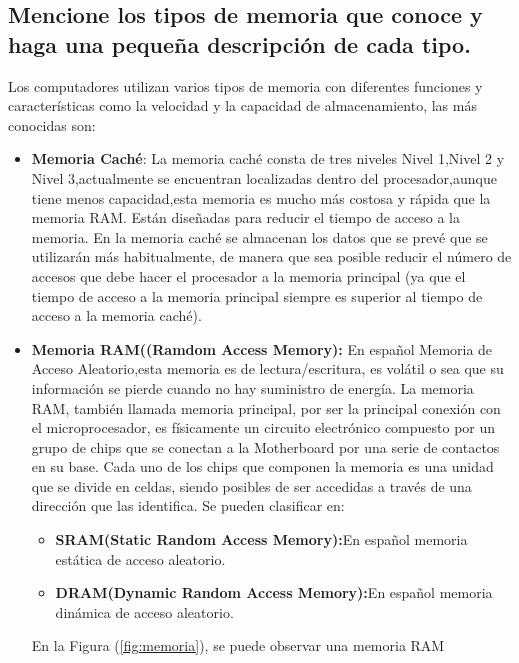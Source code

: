 \documentclass{article}
\begin{document}
\subsection{Mencione los tipos de memoria que conoce y haga una pequeña descripción de cada tipo.}
Los computadores utilizan varios tipos de memoria con diferentes funciones y características como la velocidad y la capacidad de almacenamiento, las más conocidas son:
\begin{itemize}
\item \textbf{Memoria Caché}:
    La memoria caché consta de tres niveles Nivel 1,Nivel 2 y Nivel 3,actualmente se encuentran localizadas dentro del procesador,aunque tiene menos capacidad,esta memoria es mucho más costosa y rápida que la memoria RAM.\cite{ref}\newline
    Están diseñadas para reducir el tiempo de acceso a la memoria. En la memoria caché se almacenan los datos que se prevé que se utilizarán más habitualmente, de manera que sea posible reducir el número de accesos que debe hacer el procesador a la memoria principal (ya que el tiempo de acceso a la memoria principal siempre es superior al tiempo de acceso a la memoria caché).\cite{Orenga}

    \item \textbf{Memoria RAM((Ramdom Access Memory): }En español Memoria de Acceso Aleatorio,esta memoria es de lectura/escritura, es volátil o sea que su información se pierde cuando no hay suministro de energía.\newpage
    La memoria RAM, también llamada memoria principal, por ser la principal conexión con el microprocesador, es físicamente un circuito electrónico compuesto por un grupo de chips que se conectan a la Motherboard por una serie de contactos en su base. Cada uno de los chips que componen la memoria es una unidad que se divide en celdas, siendo posibles de ser accedidas a través de una dirección que las identifica.\cite{ram}
    \newline
    Se pueden clasificar en:
    \begin{itemize}
        \item\textbf{SRAM(Static Random Access Memory):}En español memoria estática de acceso aleatorio.
        \item\textbf{DRAM(Dynamic Random Access Memory):}En español memoria dinámica de acceso aleatorio.
    \end{itemize}
    
    En la Figura (\ref{fig:memoria}), se puede observar una memoria RAM
    

\end{itemize}
\end{document}
